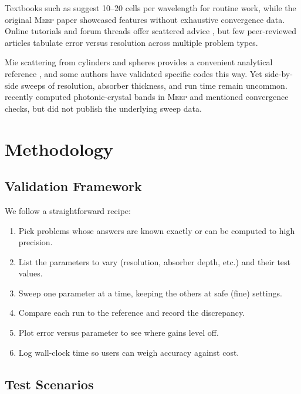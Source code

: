 \documentclass[12pt, a4paper]{article}
\newcommand{\meep}{\textsc{Meep}}
\begin{document}
Textbooks such as \citet{Taflove2005} suggest 10--20 cells per wavelength for routine work, while the original \meep{} paper \citep{Oskooi2010} showcased features without exhaustive convergence data. Online tutorials and forum threads offer scattered advice \citep{MeepDocs2024, MeepDiscussion2023}, but few peer-reviewed articles tabulate error versus resolution across multiple problem types.

Mie scattering from cylinders and spheres provides a convenient analytical reference \citep{Bohren1983}, and some authors have validated specific codes this way. Yet side-by-side sweeps of resolution, absorber thickness, and run time remain uncommon. \citet{Sulemani2024} recently computed photonic-crystal bands in \meep{} and mentioned convergence checks, but did not publish the underlying sweep data.


\section{Methodology}
\label{sec:methodology}

\subsection{Validation Framework}

We follow a straightforward recipe:
\begin{enumerate}
    \item Pick problems whose answers are known exactly or can be computed to high precision.
    \item List the parameters to vary (resolution, absorber depth, etc.) and their test values.
    \item Sweep one parameter at a time, keeping the others at safe (fine) settings.
    \item Compare each run to the reference and record the discrepancy.
    \item Plot error versus parameter to see where gains level off.
    \item Log wall-clock time so users can weigh accuracy against cost.
\end{enumerate}

\subsection{Test Scenarios}
\end{document}
